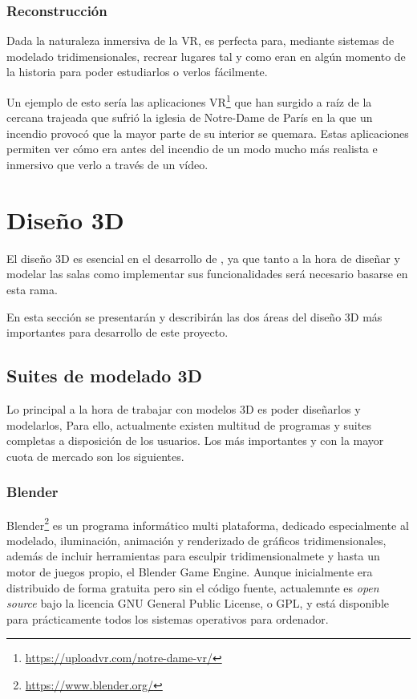 \subsubsection{Reconstrucción}

Dada la naturaleza inmersiva de la \acs{VR}, es perfecta para, mediante sistemas de modelado tridimensionales, recrear lugares tal y como eran en algún momento de la historia para poder estudiarlos o verlos fácilmente.

Un ejemplo de esto sería las aplicaciones \acs{VR}\footnote{\url{https://uploadvr.com/notre-dame-vr/}} que han surgido a raíz de la cercana trajeada que sufrió la iglesia de Notre-Dame de París en la que un incendio provocó que la mayor parte de su interior se quemara. Estas aplicaciones permiten ver cómo era antes del incendio de un modo mucho más realista e inmersivo que verlo a través de un vídeo.

\section{Diseño 3D}

El diseño 3D es esencial en el desarrollo de \MineRVa, ya que tanto a la hora de diseñar y modelar las salas como implementar sus funcionalidades será necesario basarse en esta rama.

En esta sección se presentarán y describirán las dos áreas del diseño 3D más importantes para desarrollo de este proyecto.

\subsection{Suites de modelado 3D}

Lo principal a la hora de trabajar con modelos 3D es poder diseñarlos y modelarlos, Para ello, actualmente existen multitud de programas y suites completas a disposición de los usuarios. Los más importantes y con la mayor cuota de mercado son los siguientes. 

\subsubsection{Blender}

Blender\footnote{\url{https://www.blender.org/}} es un programa informático multi plataforma, dedicado especialmente al modelado, iluminación, animación y renderizado de gráficos tridimensionales, además de incluir herramientas para esculpir tridimensionalmete y hasta un motor de juegos propio, el Blender Game Engine. Aunque inicialmente era distribuido de forma gratuita pero sin el código fuente, actualemnte es \textit{open source} bajo la licencia GNU General Public License, o GPL, y está disponible para prácticamente todos los sistemas operativos para ordenador.

